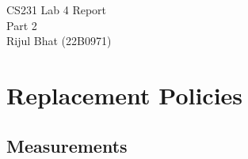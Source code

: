 \documentclass{article}
\begin{document}
    \begin{center}
      {\Huge CS231 Lab 4 Report}\\[0.5cm]
      {\Large Part 2}\\[0.5cm]   
      {\Large Rijul Bhat (22B0971)}\\[0.4cm]
    \end{center}

\tableofcontents
\clearpage


\clearpage
\pagestyle{fancy}
\section{Replacement Policies}
\subsection{Measurements}
\end{document}
